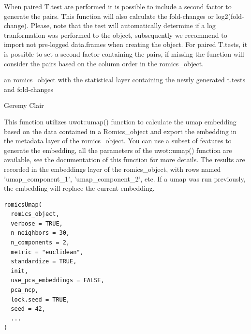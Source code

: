 \documentclass[a4paper]{book}
\begin{document}
%
\begin{Details}
When paired T.test are performed it is possible to include a second factor to generate the pairs. This function will also calculate the fold-changes or log2(fold-change). Please, note that the test will automatically determine if a log tranformation was performed to the object, subsequently we recommend to import not pre-logged data.frames when creating the object. For paired T.tests, it is possible to set a second factor containing the pairs, if missing the function will consider the pairs based on the column order in the romics\_object.
\end{Details}
%
\begin{Value}
an romics\_object with the statistical layer containing the newly generated t.tests and fold-changes
\end{Value}
%
\begin{Author}
Geremy Clair
\end{Author}
%
\begin{Description}
This function utilizes uwot::umap() function to calculate the umap embedding based on the data contained in a Romics\_object and export the embedding in the metadata layer of the romics\_object.
You can use a subset of features to generate the embedding, all the parameters of the uwot::umap() function are available, see the documentation of this function for more details.
The results are recorded in the embeddings layer of the romics\_object, with rows named 'umap\_component\_1', 'umap\_component\_2', etc.
If a umap was run previously, the embedding will replace the current embedding.
\end{Description}
%
\begin{Usage}
\begin{verbatim}
romicsUmap(
  romics_object,
  verbose = TRUE,
  n_neighbors = 30,
  n_components = 2,
  metric = "euclidean",
  standardize = TRUE,
  init,
  use_pca_embeddings = FALSE,
  pca_ncp,
  lock.seed = TRUE,
  seed = 42,
  ...
)
\end{verbatim}
\end{Usage}
%
\end{document}
